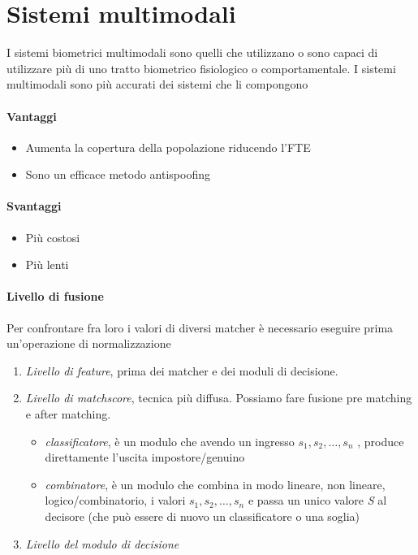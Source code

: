 \section{Sistemi multimodali}
I sistemi biometrici multimodali sono quelli che utilizzano o sono capaci di utilizzare più di uno tratto biometrico fisiologico o comportamentale. I sistemi multimodali sono più accurati dei sistemi che li compongono

\paragraph{Vantaggi}
\begin{itemize}
    \item Aumenta la copertura della popolazione riducendo l'FTE
    \item Sono un efficace metodo antispoofing
\end{itemize}

\paragraph{Svantaggi}
\begin{itemize}
    \item Più costosi
    \item Più lenti
\end{itemize}

\paragraph{Livello di fusione}
Per confrontare fra loro i valori di diversi matcher è necessario eseguire prima un’operazione di normalizzazione
\begin{enumerate}
    \item \textit{Livello di feature}, prima dei matcher e dei moduli di decisione.
    \item \textit{Livello di matchscore}, tecnica più diffusa. Possiamo fare fusione pre matching e after matching.
    \begin{itemize}
        \item \textit{classificatore}, è un modulo che avendo un ingresso $s_1, s_2, \dots, s_n$ , produce direttamente l’uscita impostore/genuino
        \item \textit{combinatore}, è un modulo che combina in modo lineare, non lineare, logico/combinatorio, i valori $s_1, s_2, \dots, s_n$ e passa un unico valore \textit{S} al decisore (che può essere di nuovo un classificatore o una soglia)
    \end{itemize}
    \item \textit{Livello del modulo di decisione}
\end{enumerate}

